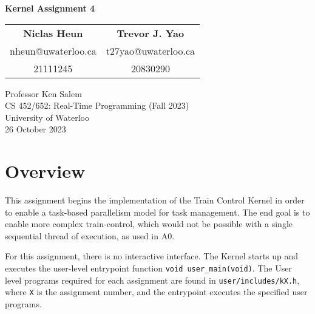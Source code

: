 \documentclass[12pt, titlepage]{article}
\begin{document}
    \begin{titlepage}
        \begin{center}
            \vspace*{5em}
            \textbf{\LARGE Kernel Assignment 4}
            \vspace*{3em}

            \begin{tabular}{c@{\hskip 8em}c}
                \textbf{\large Niclas Heun} & \textbf{\large Trevor J. Yao} \\
                {\small nheun@uwaterloo.ca} & {\small t27yao@uwaterloo.ca} \\
                {\footnotesize 21111245} & {\footnotesize 20830290} \\
            \end{tabular}

            \vfill

            Professor Ken Salem \\
            CS 452/652: Real-Time Programming (Fall 2023) \\
            University of Waterloo \\
            26 October 2023

            \vspace*{5em}

        \end{center}
    \end{titlepage}


    \pagestyle{fancy}

    \tableofcontents
    \pagebreak

    \section{Overview}
    \label{sec:overview}

    This assignment begins the implementation of the Train Control Kernel in order to enable a task-based parallelism model for task management. The end goal is to enable more complex train-control, which would not be possible with a single sequential thread of execution, as used in A0.

    For this assignment, there is no interactive interface. The Kernel starts up and executes the user-level entrypoint function \verb`void user_main(void)`. The User level programs required for each assignment are found in \verb`user/includes/kX.h`, where \verb`X` is the assignment number, and the entrypoint executes the specified user programs.
\end{document}
